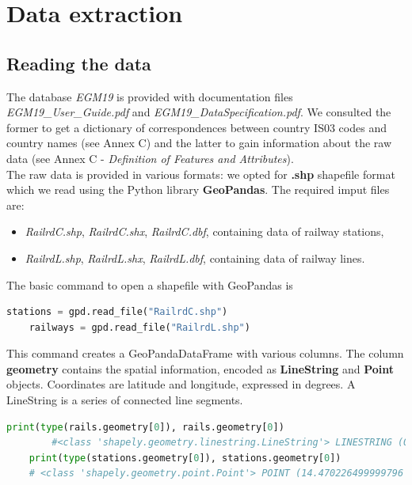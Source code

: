 \section{ Data extraction}
\subsection{Reading the data}
The database \textit{EGM19} is provided with documentation files \textit{EGM19\_User\_Guide.pdf} and \textit{EGM19\_DataSpecification.pdf}.
We consulted the former to get a dictionary of correspondences between country IS03 codes and country names (see Annex C) and the latter  to gain information about the raw data (see Annex C - \textit{Definition of Features and Attributes}). \\
The raw data is provided in various formats: we opted for \textbf{.shp} shapefile format which we read using the Python library \textbf{GeoPandas}.
The required imput files are:
\begin{itemize}
    \item \textit{RailrdC.shp}, \textit{RailrdC.shx}, \textit{RailrdC.dbf}, containing data of railway stations,
    \item \textit{RailrdL.shp}, \textit{RailrdL.shx}, \textit{RailrdL.dbf}, containing data of railway lines.
\end{itemize}
The basic command to open a shapefile with GeoPandas is 
\begin{lstlisting}[language=Python]
    stations = gpd.read_file("RailrdC.shp") 
    railways = gpd.read_file("RailrdL.shp") 
\end{lstlisting}
This command creates a GeoPandaDataFrame with various columns. The column \textbf{geometry} contains the spatial information, encoded as \textbf{LineString} and \textbf{Point} objects. Coordinates are latitude and longitude, expressed in degrees. A LineString is a series of connected line segments.
\begin{lstlisting}[language=Python]
    print(type(rails.geometry[0]), rails.geometry[0])
        #<class 'shapely.geometry.linestring.LineString'> LINESTRING (0.5972559999997884 43.64944749999984, 0.5974139999997874 43.650735499999854, 0.5974145699997874 43.66748499999854)
    print(type(stations.geometry[0]), stations.geometry[0])
    # <class 'shapely.geometry.point.Point'> POINT (14.470226499999796 47.57296499999984)
\end{lstlisting}

